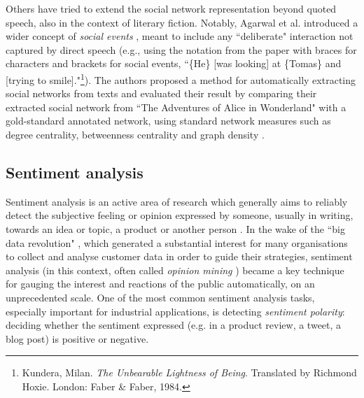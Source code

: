 \documentclass[bsc,frontabs,deptreport,singlespacing,parskip, twoside]{infthesis}
\begin{document}
Others have tried to extend the social network representation beyond quoted speech, also in the context of literary fiction. Notably, Agarwal et al. introduced a wider concept of \textit{social events} \cite{agarwal2010annotation}, meant to include any ``deliberate" interaction not captured by direct speech (e.g., using the notation from the paper with braces for characters and brackets for social events, ``\{He\} [was looking] at \{Tomas\} and [trying to smile]."\footnote{Kundera, Milan. \textit{The Unbearable Lightness of Being}. Translated by Richmond Hoxie. London: Faber \& Faber, 1984.}). The authors proposed a method for automatically extracting social networks from texts and evaluated their result  by comparing their extracted social network from ``The Adventures of Alice in Wonderland" with a gold-standard annotated network, using standard network measures such as degree centrality, betweenness centrality and graph density  \cite{Agarwal2013}.

\subsection{Sentiment analysis}
\label{sec:bg_sentiment}
Sentiment analysis is an active area of research which generally aims to reliably detect the subjective feeling or opinion expressed by someone, usually in writing, towards an idea or topic, a product or another person \cite{varghesesurvey}. In the wake of the ``big data revolution" \cite{mayer2013big}, which generated a substantial interest for many organisations to collect and analyse customer data in order to guide their strategies, sentiment analysis (in this context, often called \textit{opinion mining} \cite{pang2008opinion}) became a key technique for gauging the interest and reactions of the public automatically, on an unprecedented scale. One of the most common sentiment analysis tasks, especially important for industrial applications, is detecting \textit{sentiment polarity}: deciding whether the sentiment expressed (e.g. in a product review, a tweet, a blog post) is positive or negative.
\end{document}
